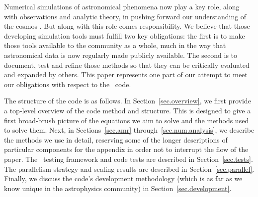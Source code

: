 Numerical simulations of astronomical phenomena now play a key role, along with observations and analytic theory, in pushing forward our understanding of the cosmos \citep[e.g.,][]{DecadalSurvey01, DecadalSurvey10}.   But along with this role comes responsibility.  We believe that those developing simulation tools must fulfill two key obligations: the first is to make those tools available to the community as a whole, much in the way that astronomical data is now regularly made publicly available.  The second is to document, test and refine those methods so that they can be critically evaluated and expanded by others.  This paper represents one part of our attempt to meet our obligations with respect to the \enzo\ code.

The structure of the code is as follows.  In Section~\ref{sec.overview}, we first provide a top-level overview of the code method and structure.  This is designed to give a first broad-brush picture of the equations we aim to solve and the methods used to solve them.  Next, in Sections~\ref{sec.amr} through~\ref{sec.num.analysis}, we describe the methods we use in detail, reserving some of the longer descriptions of particular components for the appendix in order not to interrupt the flow of the paper.  The \enzo\ testing framework and code tests are described in Section~\ref{sec.tests}.  The parallelism strategy and scaling results are described in Section~\ref{sec.parallel}.  Finally, we discuss the code's development methodology (which is as far as we know unique in the astrophysics community) in Section~\ref{sec.development}.

